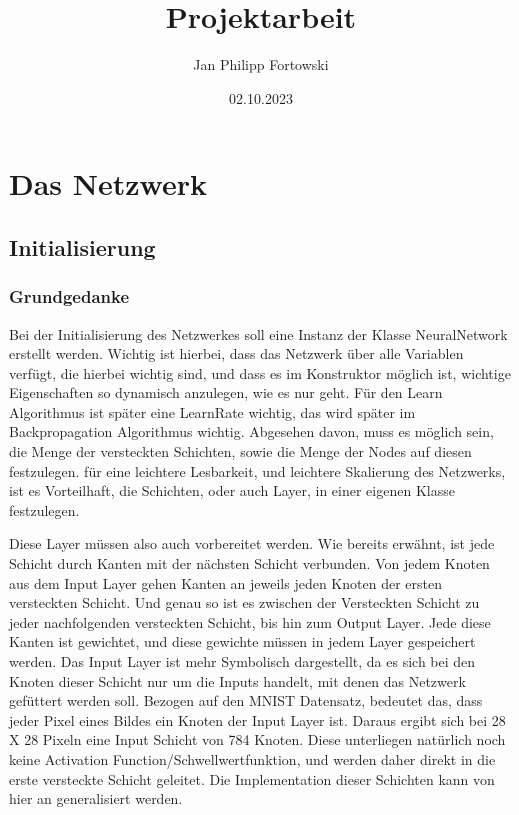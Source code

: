\documentclass[12pt]{article}
\title{\textbf{Projektarbeit}}
\author{Jan Philipp Fortowski}
\date{02.10.2023}
\begin{document}
\maketitle
\tableofcontents
\thispagestyle{empty}

\section{Das Netzwerk}
\subsection{Initialisierung}
\subsubsection{Grundgedanke}
Bei der Initialisierung des Netzwerkes soll eine Instanz der Klasse NeuralNetwork erstellt werden. Wichtig ist hierbei, dass das Netzwerk über alle Variablen verfügt, die hierbei wichtig sind, und dass es im Konstruktor möglich ist, wichtige Eigenschaften so dynamisch anzulegen, wie es nur geht. Für den Learn Algorithmus ist später eine LearnRate wichtig, das wird später im Backpropagation Algorithmus wichtig. Abgesehen davon, muss es möglich sein, die Menge der versteckten Schichten, sowie die Menge der Nodes auf diesen festzulegen. für eine leichtere Lesbarkeit, und leichtere Skalierung des Netzwerks, ist es Vorteilhaft, die Schichten, oder auch Layer, in einer eigenen Klasse festzulegen.

Diese Layer müssen also auch vorbereitet werden. Wie bereits erwähnt, ist jede Schicht durch Kanten mit der nächsten Schicht verbunden.  Von jedem Knoten aus dem Input Layer gehen Kanten an jeweils jeden Knoten der ersten versteckten Schicht. Und genau so ist es zwischen der Versteckten Schicht zu jeder nachfolgenden versteckten Schicht, bis hin zum Output Layer. Jede diese Kanten ist gewichtet, und diese gewichte müssen in jedem Layer gespeichert werden. Das Input Layer ist mehr Symbolisch dargestellt, da es sich bei den Knoten dieser Schicht nur um die Inputs handelt, mit denen das Netzwerk gefüttert werden soll. Bezogen auf den MNIST Datensatz, bedeutet das, dass jeder Pixel eines Bildes ein Knoten der Input Layer ist. Daraus ergibt sich bei 28 X 28 Pixeln eine Input Schicht von 784 Knoten. Diese unterliegen natürlich noch keine Activation Function/Schwellwertfunktion, und werden daher direkt in die erste versteckte Schicht geleitet. Die Implementation dieser Schichten kann von hier an generalisiert werden.
\end{document}
